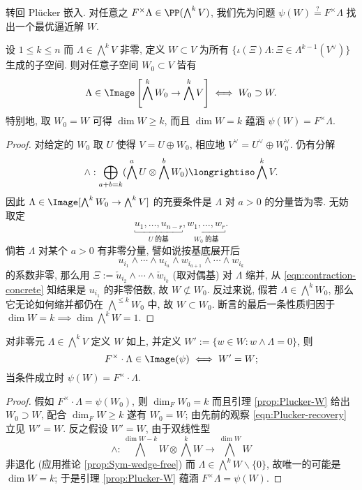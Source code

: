转回 Plücker 嵌入. 对任意之 $F^\times \Lambda \in \PP(\bigwedge^k V)$, 我们先为问题 $\psi(W) \stackrel{?}{=} F^\times \Lambda$ 找出一个最优逼近解 $W$.
\begin{lemma}\label{prop:Plucker-W}
	设 $1 \leq k \leq n$ 而 $\Lambda \in \bigwedge^k V$ 非零, 定义 $W \subset V$ 为所有 $\{ \iota(\Xi) \Lambda : \Xi \in \Lambda^{k-1}(V^\vee) \}$ 生成的子空间. 则对任意子空间 $W_0 \subset V$ 皆有
	\[ \Lambda \in \Image\left[ \bigwedge^k W_0 \to \bigwedge^k V \right] \iff W_0 \supset W. \]
	特别地, 取 $W_0=W$ 可得 $\dim W \geq k$, 而且 $\dim W = k$ 蕴涵 $\psi(W) = F^\times\Lambda$.
\end{lemma}
\begin{proof}
	对给定的 $W_0$ 取 $U$ 使得 $V = U \oplus W_0$, 相应地 $V^\vee =U^\vee \oplus W_0^\vee$. 仍有分解
	\[ \wedge: \bigoplus_{a+b=k} (\bigwedge^a U \otimes \bigwedge^b W_0) \longrightiso \bigwedge^k V.\]
	因此 $\Lambda \in \Image[\bigwedge^k W_0 \to \bigwedge^k V]$ 的充要条件是 $\Lambda$ 对 $a > 0$ 的分量皆为零. 无妨取定
	\[ \underbracket{u_1, \ldots, u_{n-r}}_{U\; \text{的基}}, \underbracket{w_1, \ldots, w_r}_{W_0\; \text{的基}}. \]
	倘若 $\Lambda$ 对某个 $a > 0$ 有非零分量, 譬如说按基底展开后
	\[ u_{i_1} \wedge \cdots \wedge u_{i_a} \wedge w_{i_{a+1}} \wedge \cdots \wedge w_{i_k} \]
	的系数非零, 那么用 $\Xi := \check{u}_{i_2} \wedge \cdots \wedge \check{w}_{i_k}$ (取对偶基) 对 $\Lambda$ 缩并, 从 \eqref{eqn:contraction-concrete} 知结果是 $u_{i_1}$ 的非零倍数, 故 $W \not\subset W_0$. 反过来说, 假若 $\Lambda \in \bigwedge^k W_0$, 那么它无论如何缩并都仍在 $\bigwedge^{\leq k} W_0$ 中, 故 $W \subset W_0$. 断言的最后一条性质归因于 $\dim W = k \implies \dim \bigwedge^k W = 1$.
\end{proof}

\begin{lemma}
	对非零元 $\Lambda \in \bigwedge^k V$ 定义 $W$ 如上, 并定义 $W' := \{ w \in W: w \wedge \Lambda = 0 \}$, 则
	\[ F^\times \cdot \Lambda \in \Image(\psi) \iff W'=W; \]
	当条件成立时 $\psi(W) = F^\times \cdot\Lambda$.
\end{lemma}
\begin{proof}
	假如 $F^\times \cdot \Lambda = \psi(W_0)$, 则 $\dim_F W_0 = k$ 而且引理 \ref{prop:Plucker-W} 给出 $W_0 \supset W$, 配合 $\dim_F W \geq k$ 遂有 $W_0=W$; 由先前的观察 \eqref{eqn:Plucker-recovery} 立见 $W'=W$. 反之假设 $W'=W$, 由于双线性型
	\[ \wedge: \bigwedge^{\dim W - k} W \otimes \bigwedge^k W \to \bigwedge^{\dim W} W \]
	非退化 (应用推论 \ref{prop:Sym-wedge-free}) 而 $\Lambda \in \bigwedge^k W \smallsetminus \{0\}$, 故唯一的可能是 $\dim W = k$; 于是引理 \ref{prop:Plucker-W} 蕴涵 $F^\times\Lambda = \psi(W)$.
\end{proof}

